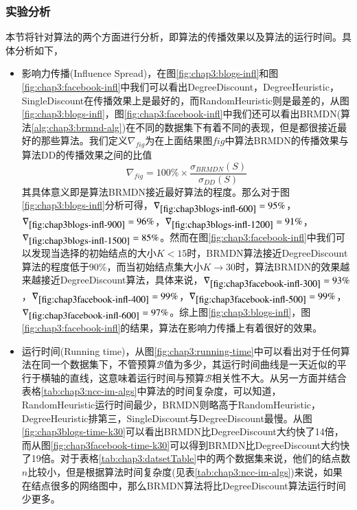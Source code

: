 \subsubsection{实验分析}
本节将针对算法的两个方面进行分析，即算法的传播效果以及算法的运行时间。具体分析如下，
\begin{itemize}
\item 影响力传播(Influence Spread)，在图\ref{fig:chap3:blogs-infl}和图\ref{fig:chap3:facebook-infl}中我们可以看出DegreeDiscount，DegreeHeuristic，SingleDiscount在传播效果上是最好的，而RandomHeuristic则是最差的，从图\ref{fig:chap3:blogs-infl}，图\ref{fig:chap3:facebook-infl}中我们还可以看出BRMDN(算法\ref{alg:chap3:brmnd-alg})在不同的数据集下有着不同的表现，但是都很接近最好的那些算法。我们定义$\nabla_{fig}$为在上面结果图$fig$中算法BRMDN的传播效果与算法DD的传播效果之间的比值
\begin{displaymath}
\nabla_{fig} = 100\% \times \frac{\sigma_{BRMDN}(S)}{\sigma_{DD}(S)}
\end{displaymath}
其具体意义即是算法BRMDN接近最好算法的程度。那么对于图\ref{fig:chap3:blogs-infl}分析可得，$\nabla_{\ref{fig:chap3blogs-infl-600}}=95\%$，$\nabla_{\ref{fig:chap3blogs-infl-900}}=96\%$，$\nabla_{\ref{fig:chap3blogs-infl-1200}}=91\%$，$\nabla_{\ref{fig:chap3blogs-infl-1500}}=85\%$。然而在图\ref{fig:chap3:facebook-infl}中我们可以发现当选择的初始结点的大小$K<15$时，BRMDN算法接近DegreeDiscount算法的程度低于90\%，而当初始结点集大小$K \rightarrow 30$时，算法BRMDN的效果越来越接近DegreeDiscount算法，具体来说，$\nabla_{\ref{fig:chap3facebook-infl-300}}=93\%$，$\nabla_{\ref{fig:chap3facebook-infl-400}}=99\%$，$\nabla_{\ref{fig:chap3facebook-infl-500}}=99\%$，$\nabla_{\ref{fig:chap3facebook-infl-600}}=97\%$。综上图\ref{fig:chap3:blogs-infl}，图\ref{fig:chap3:facebook-infl}的结果，算法在影响力传播上有着很好的效果。
\item 运行时间(Running time)，从图\ref{fig:chap3:running-time}中可以看出对于任何算法在同一个数据集下，不管预算$\mathcal{B}$值为多少，其运行时间曲线是一天近似的平行于横轴的直线，这意味着运行时间与预算$\mathcal{B}$相关性不大。从另一方面并结合表格\ref{tab:chap3:ncc-im-algs}中算法的时间复杂度，可以知道，RandomHeuristic运行时间最少，BRMDN则略高于RandomHeuristic，DegreeHeuristic排第三，SingleDiscount与DegreeDiscount最慢。从图\ref{fig:chap3blogs-time-k30}可以看出BRMDN比DegreeDiscount大约快了14倍，而从图\ref{fig:chap3facebook-time-k30}可以得到BRMDN比DegreeDiscount大约快了19倍。对于表格\ref{tab:chap3:datsetTable}中的两个数据集来说，他们的结点数$n$比较小，但是根据算法时间复杂度(见表\ref{tab:chap3:ncc-im-algs})来说，如果在结点很多的网络图中，那么BRMDN算法将比DegreeDiscount算法运行时间少更多。
\end{itemize}



